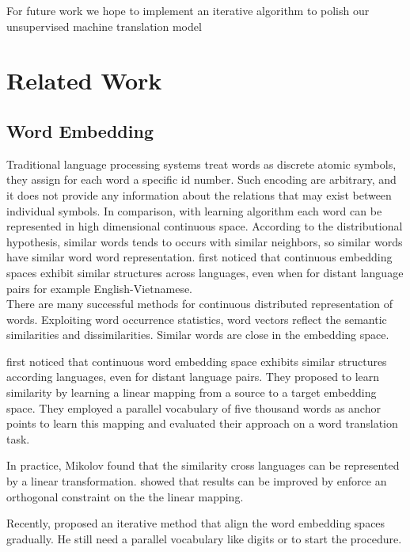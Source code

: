 For future work we hope to implement an iterative algorithm to polish our unsupervised machine translation model 
\section{Related Work}

\subsection{Word Embedding}
\indent Traditional language processing systems treat words as discrete atomic symbols, they assign for each word a specific id number. Such encoding are arbitrary, and it does not provide any information about the relations that may exist between individual symbols. In comparison, with learning algorithm each word can be represented in high dimensional continuous space. According to the distributional hypothesis, similar words tends to occurs with similar neighbors, so similar words have similar word word representation.  \cite{mikolov2013exploiting} first noticed that continuous embedding spaces exhibit similar structures across languages, even when for distant language pairs for example English-Vietnamese. \\

There are many successful methods \cite{mikolov2013efficient} \cite{mikolov2013distributed}for continuous distributed representation of words. Exploiting word occurrence statistics, word vectors reflect the semantic similarities and dissimilarities. Similar words are close in the embedding space. \cite{pennington2014glove}

 
\cite{bojanowski2016enriching}


\cite{mikolov2013exploiting} first noticed that continuous word embedding space exhibits similar structures according languages, even for distant language pairs. They proposed to learn similarity by learning a linear mapping from a source to a target embedding space. They employed a parallel vocabulary of five thousand words as anchor points to learn this mapping and evaluated their approach on a word translation task.

In practice, Mikolov found that the similarity cross languages can be represented by a linear transformation.\cite{xing2015normalized} showed that results can be improved by enforce an orthogonal constraint on the the linear mapping.

Recently, \cite{artetxe2017learning} proposed an iterative method that align the word embedding spaces gradually. He still need a parallel vocabulary like digits or to start the procedure.

